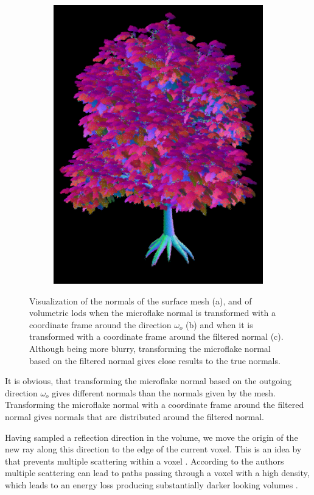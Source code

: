 \begin{figure}[ht]
\begin{subfigure}[b]{0.3\linewidth}
        \includegraphics[width=1\linewidth]{img/normal_map_vndf_normal_aligned.png}
        \caption{}
    \end{subfigure}
    \caption[Visualization of normals with meshes and volumes]{Visualization of the normals of the surface mesh (a), and of volumetric \acsp{lod} when the microflake normal is transformed with a coordinate frame around the direction $\omega_o$ (b) and when it is transformed with a coordinate frame around the filtered normal (c).
             Although being more blurry, transforming the microflake normal based on the filtered normal gives close results to the true normals.}
	\label{fig:tree_normal_maps}
\end{figure}
It is obvious, that transforming the microflake normal based on the outgoing direction $\omega_o$ gives different normals than the normals given by the mesh.
Transforming the microflake normal with a coordinate frame around the filtered normal gives normals that are distributed around the filtered normal.

Having sampled a reflection direction in the volume, we move the origin of the new ray along this direction to the edge of the current voxel.
This is an idea by \citeauthor{vicini2021non} that prevents multiple scattering within a voxel \cite{vicini2021non}.
According to the authors multiple scattering can lead to paths passing through a voxel with a high density, which leads to an energy loss producing substantially darker looking volumes \cite{vicini2021non}.